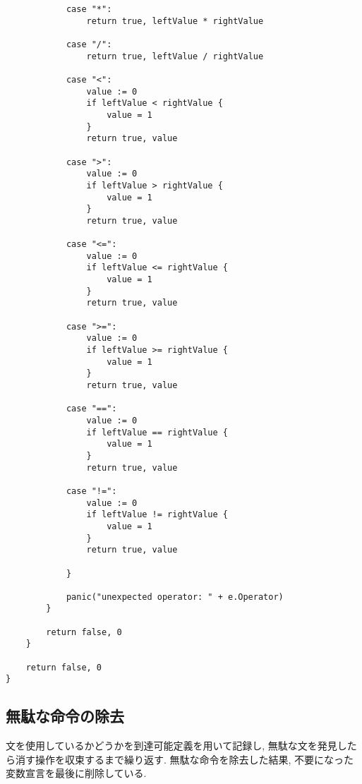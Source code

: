 \documentclass[a4j]{jarticle}
\begin{document}
\begin{verbatim}
            case "*":
                return true, leftValue * rightValue

            case "/":
                return true, leftValue / rightValue

            case "<":
                value := 0
                if leftValue < rightValue {
                    value = 1
                }
                return true, value

            case ">":
                value := 0
                if leftValue > rightValue {
                    value = 1
                }
                return true, value

            case "<=":
                value := 0
                if leftValue <= rightValue {
                    value = 1
                }
                return true, value

            case ">=":
                value := 0
                if leftValue >= rightValue {
                    value = 1
                }
                return true, value

            case "==":
                value := 0
                if leftValue == rightValue {
                    value = 1
                }
                return true, value

            case "!=":
                value := 0
                if leftValue != rightValue {
                    value = 1
                }
                return true, value

            }

            panic("unexpected operator: " + e.Operator)
        }

        return false, 0
    }

    return false, 0
}
\end{verbatim}

\subsection{無駄な命令の除去}

文を使用しているかどうかを到達可能定義を用いて記録し, 無駄な文を発見したら消す操作を収束するまで繰り返す. 無駄な命令を除去した結果, 不要になった変数宣言を最後に削除している.
\end{document}
